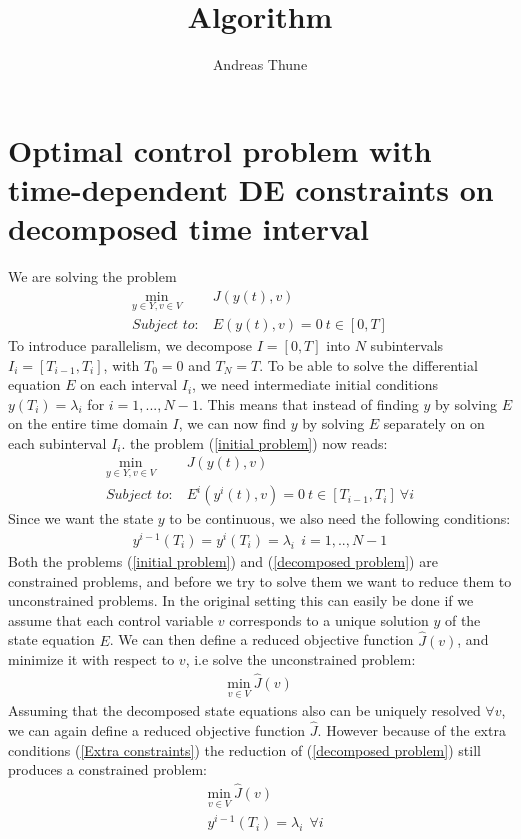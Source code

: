 \documentclass[11pt,a4paper]{article}
\author{Andreas Thune}
\title{Algorithm}
\begin{document}
\maketitle
\section{Optimal control problem with time-dependent DE constraints on decomposed time interval}
We are solving the problem
\begin{align}
\underset{y\in Y,v\in V}{\text{min}} \ &J(y(t),v) \\
\textit{Subject to:} \ &E(y(t),v)=0 \ t\in [0,T] \label{initial problem}
\end{align}
To introduce parallelism, we decompose $I=[0,T]$ into $N$ subintervals $I_i=[T_{i-1},T_i]$, with $T_0=0$ and $T_N=T$. To be able to solve the differential equation $E$ on each interval $I_i$, we need intermediate initial conditions $y(T_i)=\lambda_i$ for $i=1,...,N-1$. This means that instead of finding $y$ by solving $E$ on the entire time domain $I$, we can now find $y$ by solving $E$ separately on on each subinterval $I_i$. the problem (\ref{initial problem}) now reads:
\begin{align}
\underset{y\in Y,v\in V}{\text{min}} \ &J(y(t),v) \\
\textit{Subject to:} \ &E^i(y^i(t),v)=0 \ t\in [T_{i-1},T_i] \ \forall i \label{decomposed problem}
\end{align} 
Since we want the state $y$ to be continuous, we also need the following conditions:
\begin{align}
y^{i-1}(T_i)=y^i(T_i)=\lambda_i \ \ i=1,..,N-1 \label{Extra constraints}
\end{align} 
Both the problems (\ref{initial problem}) and (\ref{decomposed problem}) are constrained problems, and before we try to solve them we want to reduce them to unconstrained problems. In the original setting this can easily be done if we assume that each control variable $v$ corresponds to a unique solution $y$ of the state equation $E$. We can then define a reduced objective function $\hat{J}(v)$, and minimize it with respect to $v$, i.e solve the unconstrained problem:
\begin{align*}
\underset{v\in V}{\text{min}} \ \hat J(v)
\end{align*} 
Assuming that the decomposed state equations also can be uniquely resolved $\forall v$, we can again define a reduced objective function  $\hat{J}$. However because of the extra conditions (\ref{Extra constraints}) the reduction of (\ref{decomposed problem}) still produces a constrained problem:
\begin{align}
&\underset{v\in V}{\text{min}} \ \hat J(v) \\
&y^{i-1}(T_i)=\lambda_i \ \ \forall i \label{constrained reduced}
\end{align} 
\end{document}
